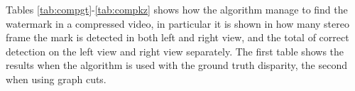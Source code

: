 Tables \ref{tab:compgt}-\ref{tab:compkz} shows how the algorithm manage to find the watermark in a compressed video, in particular it is shown in how many stereo frame the mark is detected in both left and right view, and the total of correct detection on the left view and right view separately. The first table shows the results when the algorithm is used with the ground truth disparity, the second when using graph cuts.

\clearpage
 
\begin{table}[h!]
\begin{center}
\caption{Detection table when ground truth disparity is used.  \label{tab:compgt}}
\end{center}
\end{table}
 
